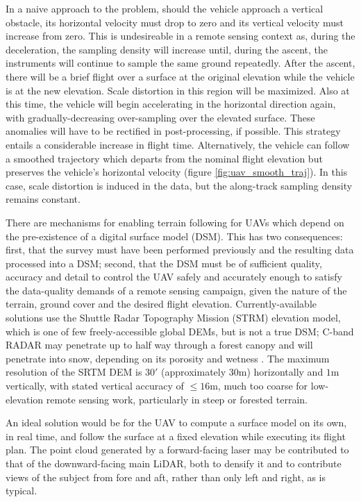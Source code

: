 \documentclass[10pt,a4paper]{report}
\begin{document}
In a naive approach to the problem, should the vehicle approach a vertical obstacle, its horizontal velocity must drop to zero and its vertical velocity must increase from zero. This is undesireable in a remote sensing context as, during the deceleration, the sampling density will increase until, during the ascent, the instruments will continue to sample the same ground repeatedly. After the ascent, there will be a brief flight over a surface at the original elevation while the vehicle is at the new elevation. Scale distortion in this region will be maximized. Also at this time, the vehicle will begin accelerating in the horizontal direction again, with gradually-decreasing over-sampling over the elevated surface. These anomalies will have to be rectified in post-processing, if possible. This strategy entails a considerable increase in flight time. Alternatively, the vehicle can follow a smoothed trajectory which departs from the nominal flight elevation but preserves the vehicle's horizontal velocity (figure \ref{fig:uav_smooth_traj}). In this case, scale distortion is induced in the data, but the along-track sampling density remains constant.

There are mechanisms for enabling terrain following for UAVs which depend on the pre-existence of a digital surface model (DSM). This has two consequences: first, that the survey must have been performed previously and the resulting data processed into a DSM; second, that the DSM must be of sufficient quality, accuracy and detail to control the UAV safely and accurately enough to satisfy the data-quality demands of a remote sensing campaign, given the nature of the terrain, ground cover and the desired flight elevation. Currently-available solutions use the Shuttle Radar Topography Mission (STRM) elevation model, which is one of few freely-accessible global DEMs, but is not a true DSM; C-band RADAR may penetrate up to half way through a forest canopy \cite{Carabajal2005} and will penetrate into snow, depending on its porosity and wetness \cite{Tighe2009}. The maximum resolution of the SRTM DEM is $30'$ (approximately $30\si{\m}$) horizontally and $1\si{\m}$ vertically, with stated vertical accuracy of $\leq16\si{\m}$, much too coarse for low-elevation remote sensing work, particularly in steep or forested terrain.

An ideal solution would be for the UAV to compute a surface model on its own, in real time, and follow the surface at a fixed elevation while executing its flight plan. The point cloud generated by a forward-facing laser may be contributed to that of the downward-facing main LiDAR, both to densify it and to contribute views of the subject from fore and aft, rather than only left and right, as is typical. 
\end{document}
